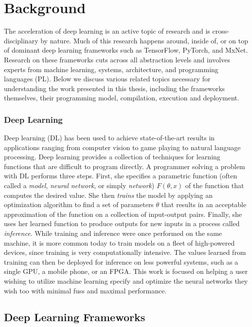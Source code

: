 \chapter{Background}
\label{ch:related}

The acceleration of deep learning is an active topic of research and is
  cross-disciplinary by nature.
Much of this research happens around, inside of, or on top of
  dominant deep learning frameworks such as TensorFlow, PyTorch, and MxNet.
Research on these frameworks cuts across all abstraction levels and
  involves experts from machine learning, systems, architecture, and programming languages (PL).
Below we discuss various related topics necessary for understanding the work presented
  in this thesis, including the frameworks themselves, their programming model, compilation, execution and deployment.

\subsection{Deep Learning}

Deep learning (DL) has been used to achieve state-of-the-art results in
  applications ranging from computer vision to game
  playing to natural language processing.
Deep learning provides a collection of techniques for learning functions that are difficult
  to program directly.
A programmer solving a problem with DL performs three steps.
First, she specifies a parametric function (often called a \textit{model},
  \textit{neural network}, or simply \textit{network}) $F(\theta, x)$ of the function
  that computes the desired value.
She then \textit{trains} the model by applying an optimization algorithm to find a set of
  parameters $\theta$ that results in an acceptable approximation of the function on a
  collection of input-output pairs.
Finally, she uses her learned function to produce outputs for new inputs in
  a process called \textit{inference}.
While training and inference were once performed on the same machine,
  it is more common today to train models on a fleet of high-powered devices,
  since training is very computationally intensive.
The values learned from training can then be deployed for inference on less powerful systems,
  such as a single GPU, a mobile phone, or an FPGA.
This work is focused on helping a user wishing to utilize machine learning specify and optimize
  the neural networks they wish too with minimal fuss and maximal performance.

\section{Deep Learning Frameworks}

